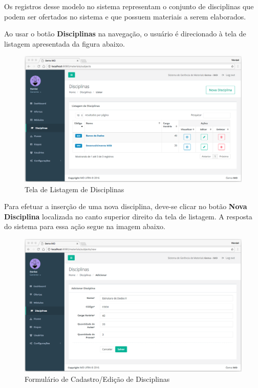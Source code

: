 Os registros desse modelo no sistema representam o conjunto de disciplinas que podem ser ofertados no sistema e que possuem materiais a serem elaborados.

Ao usar o botão \textbf{Disciplinas} na navegação, o usuário é direcionado à tela de listagem apresentada da figura abaixo.

\begin{figure}[H]
\centering
     \includegraphics[width=1.0\textwidth]{Screens/SubjectsList.png}
      \caption{Tela de Listagem de Disciplinas}
       \label{fig:scSubjectsList}
\end{figure}

Para efetuar a inserção de uma nova disciplina, deve-se clicar no botão \textbf{Nova Disciplina} localizada no canto superior direito da tela de listagem. A resposta do sistema para essa ação segue na imagem abaixo.

\begin{figure}[H]
\centering
     \includegraphics[width=1.0\textwidth]{Screens/SubjectsForm.png}
      \caption{Formulário de Cadastro/Edição de Disciplinas}
       \label{fig:scSubjectsForm}
\end{figure}

